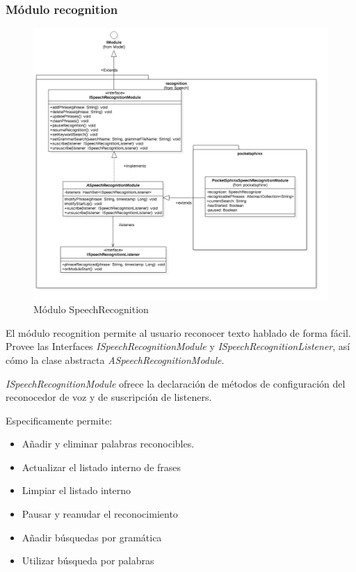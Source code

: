 \subsubsection{Módulo recognition}
\begin{figure}
	\centering
	\includegraphics[width=1\linewidth]{imagenes/diagramas/SpeechRecognitionModule.png}
	\caption{Módulo SpeechRecognition}
	\label{fig:speech-recognition-module}
\end{figure}
El módulo recognition permite al usuario reconocer texto hablado de forma fácil.
Provee las Interfaces \textit{ISpeechRecognitionModule} y \textit{ISpeechRecognitionListener}, así cómo la clase abstracta \textit{ASpeechRecognitionModule}.

\textit{ISpeechRecognitionModule} ofrece la declaración de métodos de configuración del reconocedor de  voz y de suscripción de listeners.


Especificamente permite:
\begin{itemize}
 	\item Añadir y eliminar palabras reconocibles.
 	\item Actualizar el listado interno de frases
	\item Limpiar el listado interno
	\item Pausar y reanudar el reconocimiento
	\item Añadir búsquedas por gramática
	\item Utilizar búsqueda por palabras
 	 
\end{itemize}
\newpage


